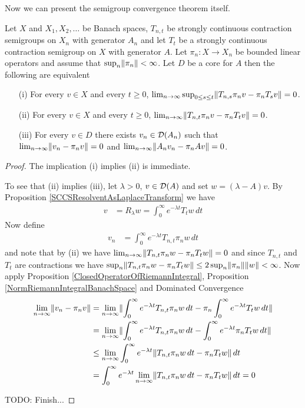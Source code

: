 Now we can present the semigroup convergence theorem itself.

\begin{thm}\label{KurtzSovaSemigroupConvergence}Let $X$ and $X_1, X_2, \dotsc$ be Banach spaces, $T_{n,t}$ be strongly continuous contraction semigroups on $X_n$ with generator $A_n$ and let $T_t$ be a strongly continuous contraction semigroup on $X$ with generator $A$.  Let $\pi_n : X \to X_n$ be bounded linear operators and assume that $\sup_{n} \lVert \pi_n \rVert < \infty$.  Let $D$ be a
core for $A$ then the following are equivalent
\begin{itemize}
\item[(i)]For every $v \in X$ and every $t \geq 0$,  $\lim_{n \to \infty} \sup_{0 \leq s \leq t} \lVert T_{n,s} \pi_n v - \pi_n T_s v \rVert = 0$.
\item[(ii)]For every $v \in X$ and every $t \geq 0$,  $\lim_{n \to \infty} \lVert T_{n,t} \pi_n v - \pi_n T_t v \rVert = 0$.
\item[(iii)] For every $v \in D$ there exists $v_n \in \mathcal{D}(A_n)$ such that $\lim_{n \to \infty} \lVert v_n - \pi_n v \rVert = 0$ and $\lim_{n \to \infty} \lVert A_n v_n - \pi_n A v \rVert = 0$.
\end{itemize}
\end{thm}
\begin{proof}
The implication (i) implies (ii) is immediate.

To see that (ii) implies (iii), let $\lambda > 0$, $v \in \mathcal{D}(A)$ and set $w = (\lambda - A) v$.  By Proposition \ref{SCCSResolventAsLaplaceTransform} we have
\begin{align*}
v &= R_\lambda w = \int_0^\infty e^{- \lambda t} T_t w \, dt
\end{align*}
Now define
\begin{align*}
v_n &= \int_0^\infty e^{- \lambda t} T_{n,t} \pi_n w \, dt
\end{align*}
and note that by (ii) we have $\lim_{n \to \infty} \lVert T_{n,t} \pi_n w - \pi_n T_t w \rVert = 0$ and since $T_{n,t}$ and $T_t$ are contractions we have $\sup_n \lVert T_{n,t} \pi_n w - \pi_n T_t w \rVert \leq 2 \sup_n \lVert \pi_n \rVert \lVert w \rVert < \infty$. Now apply Proposition \ref{ClosedOperatorOfRiemannIntegral}, Proposition \ref{NormRiemannIntegralBanachSpace} and Dominated Convergence
\begin{align*}
\lim_{n \to \infty} \lVert v_n - \pi_n v \rVert &= \lim_{n \to \infty} \lVert \int_0^\infty e^{- \lambda t} T_{n,t} \pi_n w \, dt - \pi_n \int_0^\infty e^{- \lambda t} T_t w \, dt \rVert \\
&= \lim_{n \to \infty} \lVert \int_0^\infty e^{- \lambda t} T_{n,t} \pi_n w \, dt - \int_0^\infty e^{- \lambda t} \pi_n  T_t w \, dt \rVert \\
&\leq \lim_{n \to \infty} \int_0^\infty e^{- \lambda t} \lVert T_{n,t} \pi_n w \, dt - \pi_n  T_t w \rVert \, dt \\
&= \int_0^\infty e^{- \lambda t} \lim_{n \to \infty} \lVert T_{n,t} \pi_n w \, dt - \pi_n  T_t w \rVert \, dt = 0\\
\end{align*}

TODO: Finish...
\end{proof}

